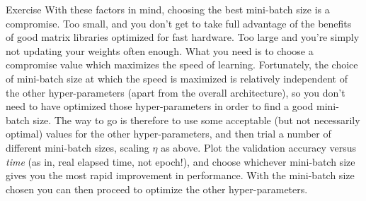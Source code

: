 \begin{exerciseBox}{Exercise}
With these factors in mind, choosing the best mini-batch size is a compromise. Too small, and you don't get to take full advantage of the benefits of good matrix libraries optimized for fast hardware. Too large and you're simply not updating your weights often enough. What you need is to choose a compromise value which maximizes the speed of learning. Fortunately, the choice of mini-batch size at which the speed is maximized is relatively independent of the other hyper-parameters (apart from the overall architecture), so you don't need to have optimized those hyper-parameters in order to find a good mini-batch size. The way to go is therefore to use some acceptable (but not necessarily optimal) values for the other hyper-parameters, and then trial a number of different mini-batch sizes, scaling $\eta$ as above. Plot the validation accuracy versus \emph{time} (as in, real elapsed time, not epoch!), and choose whichever mini-batch size gives you the most rapid improvement in performance. With the mini-batch size chosen you can then proceed to optimize the other hyper-parameters.



\end{exerciseBox}
